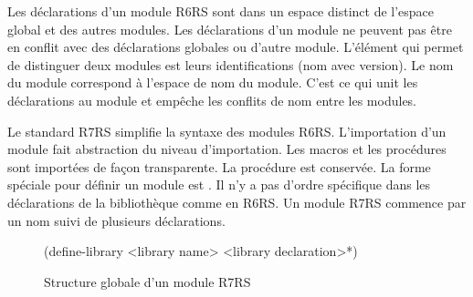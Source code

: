 Les déclarations d'un module R6RS sont dans un espace distinct de l'espace global et
des autres modules. Les déclarations d'un module ne peuvent pas être en conflit avec
des déclarations globales ou d'autre module. L'élément qui permet de distinguer deux modules
est leurs identifications (nom avec version). Le nom du module correspond à l'espace de nom du module.
C'est ce qui unit les déclarations au module et empêche les conflits de nom entre
les modules.







Le standard R7RS\cite{Scheme:R7RS} simplifie la syntaxe des modules
R6RS\cite{Scheme:R6RS}.  L'importation d'un module fait abstraction du niveau
d'importation. Les macros et les procédures sont importées de façon
transparente. La procédure  est conservée. La forme spéciale pour
définir un module est . Il n'y a pas d'ordre spécifique
dans les déclarations de la bibliothèque comme en R6RS. Un module R7RS commence par
un nom suivi de plusieurs déclarations.\\
\begin{figure}[ht]
  \centering
  \begin{mplisting}{0.5}
(define-library <library name>
  <library declaration>*)
\end{mplisting}
  \caption{Structure globale d'un module R7RS}
  \label{fig:syntax->define-library}
\end{figure}

